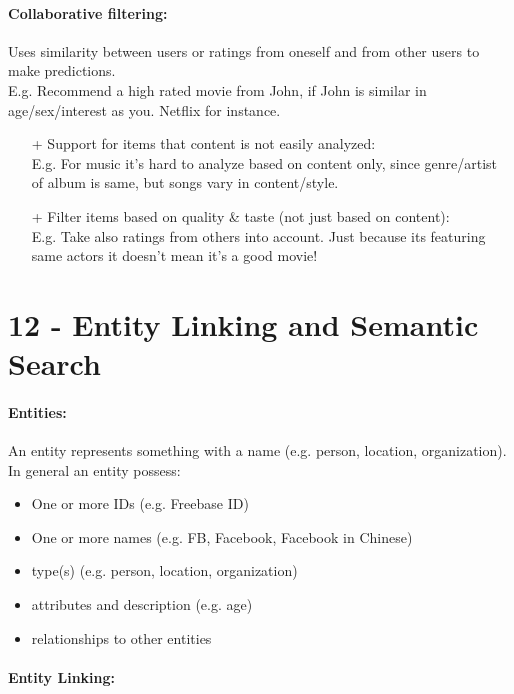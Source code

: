 \documentclass[a4paper,11pt]{article}
\newcommand{\msection}[1]{\section{#1}\vspace{-0.5mm}}
\begin{document}
\begin{multicols}{2}
\paragraph{Collaborative filtering:} Uses similarity between users or ratings from oneself and from other users to make predictions.\\
E.g. Recommend a high rated movie from John, if John is similar in age/sex/interest as you. Netflix for instance.
\begin{itemize}
  \item[+] Support for items that content is not easily analyzed:\\
  E.g. For music it's hard to analyze based on content only, since genre/artist of album is same, but songs vary in content/style.
  \item[+] Filter items based on quality \& taste (not just based on content):\\
  E.g. Take also ratings from others into account. Just because its featuring same actors it doesn't mean it's a good movie!
\end{itemize}

\msection{12 - Entity Linking and Semantic Search}
\paragraph{Entities:} An entity represents something with a name (e.g. person, location, organization). In general an entity possess:
\begin{itemize}
  \item One or more IDs (e.g. Freebase ID)
  \item One or more names (e.g. FB, Facebook, Facebook in Chinese)
  \item type(s) (e.g. person, location, organization)
  \item attributes and description (e.g. age)
  \item relationships to other entities
\end{itemize}

\paragraph{Entity Linking:} 
\end{multicols}%
\end{document}
